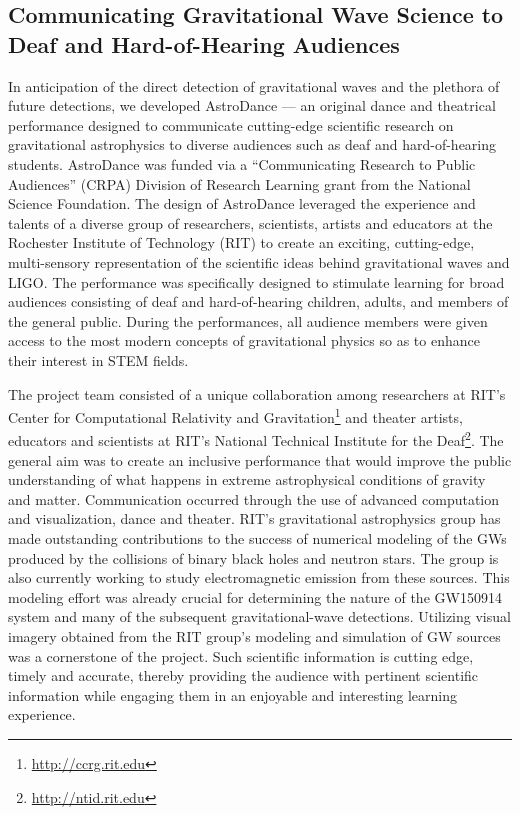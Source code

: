 \documentclass[11.5pt]{sig-alternate} %
\begin{document}
\begin{large}
\subsection*{Communicating Gravitational Wave Science to Deaf and Hard-of-Hearing Audiences}

In anticipation of the direct detection of gravitational waves and the plethora of future detections, we developed AstroDance — an original dance and theatrical performance designed to communicate cutting-edge scientific research on gravitational astrophysics to diverse audiences such as deaf and hard-of-hearing students.  AstroDance was funded via a “Communicating Research to Public Audiences” (CRPA) Division of Research Learning grant from the National Science Foundation.  The design of AstroDance leveraged the experience and talents of a diverse group of researchers, scientists, artists and educators at the Rochester Institute of Technology (RIT) to create an exciting, cutting-edge, multi-sensory representation of the scientific ideas behind gravitational waves and LIGO.  The performance was specifically designed to stimulate learning for broad audiences consisting of deaf and hard-of-hearing children, adults, and members of the general public.  During the performances, all audience members were given access to the most modern concepts of gravitational physics so as to enhance their interest in STEM fields.

The project team consisted of a unique collaboration among researchers at RIT’s Center for Computational Relativity and Gravitation\footnote{\url{http://ccrg.rit.edu}} and theater artists, educators and scientists at RIT’s National Technical Institute for the Deaf\footnote{\url{http://ntid.rit.edu}}. The general aim was to create an inclusive performance that would improve the public understanding of what happens in extreme astrophysical conditions of gravity and matter. Communication occurred through the use of advanced computation and visualization, dance and theater.  RIT’s gravitational astrophysics group has made outstanding contributions to the success of numerical modeling of the GWs produced by the collisions of binary black holes and neutron stars. The group is also currently working to study electromagnetic emission from these sources. This modeling effort was already crucial for determining the nature of the GW150914 system and many of the subsequent gravitational-wave detections.  Utilizing visual imagery obtained from the RIT group's modeling and simulation of GW sources was a cornerstone of the project.  Such scientific information is cutting edge, timely and accurate, thereby providing the audience with pertinent scientific information while engaging them in an enjoyable and interesting learning experience.  


\end{large}
\end{document}
